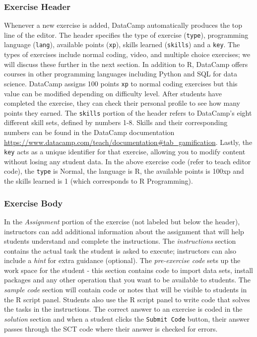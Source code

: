 \documentclass[12pt]{article}\usepackage[]{graphicx}\usepackage[]{color}
\begin{document}
\subsubsection{Exercise Header}
Whenever a new exercise is added, DataCamp automatically produces the top line of the editor. The header specifies the type
of exercise (\texttt{type}), programming language (\texttt{lang}), available points (\texttt{xp}), skills learned (\texttt{skills}) and a \texttt{key}. 
The types of exercises include normal coding, video, and multiple choice exercises; we will discuss these further in the next section. In addition to R, DataCamp offers courses in other programming languages including Python and SQL for data science.
DataCamp assigns 100 points \texttt{xp} to normal coding exercises but this value can be modified depending on
difficulty level. After students have completed the exercise, they can check their personal profile to see how many points they earned.
The \texttt{skills} portion of the header refers to DataCamp's
eight different skill sets, defined by numbers 1-8. Skills and their corresponding numbers can be found in the DataCamp
documentation \url{https://www.datacamp.com/teach/documentation#tab_gamification}. 
Lastly, the \texttt{key} acts as a unique
identifier for that exercise, allowing you to modify content without losing any student data. 
In the above exercise code (refer to teach editor code), the \texttt{type} is Normal, the language is R, the available points is 100xp and the skills learned is 1 (which 
corresponds to R Programming). 

\subsubsection{Exercise Body}
In the \textit{Assignment} portion of the exercise (not labeled but below the header), instructors can add additional information about the assignment that will help
students understand and complete the instructions. The \textit{instructions} section contains the actual task the student is
asked to execute; instructors can also include a \textit{hint} for extra guidance (optional). The \textit{pre-exercise code} sets up the work space for 
the student - this section contains code to import data sets, install packages and any other operation that you want to be available to
students. The \textit{sample code} section will contain code or notes that will be visible to students in the R script panel. Students also use the R script panel to write code that solves the tasks in the instructions. The correct answer to an exercise is coded in the \textit{solution} section
and when a student clicks the \texttt{Submit Code} button, their answer passes through the SCT code where their answer is checked for errors.
\end{document}
